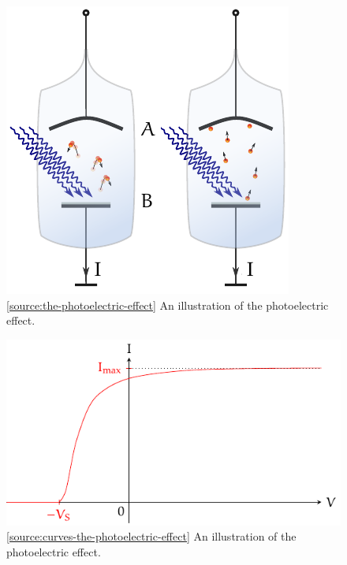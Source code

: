 \documentclass[oneside]{book}
\begin{document}
\begin{minipage}{0.5\textwidth}
    \begin{figure}[H]
        \centering
        \includegraphics[width=\textwidth]{../images/The-Photoelectric-Effect/Illustration.pdf}
        \caption{\ref{source:the-photoelectric-effect} An illustration of the photoelectric effect.}
        \label{fig:the-photoelectric-effect}
    \end{figure}
    \begin{figure}[H]
        \centering
        \includegraphics[width=\textwidth,page=1]{../images/The-Photoelectric-Effect/The-Photoelectric-Effect.pdf}
        \caption{\ref{source:curves-the-photoelectric-effect} An illustration of the photoelectric effect.}
        \label{fig:curves-the-photoelectric-effect}
    \end{figure}
\end{minipage}%
\end{document}
